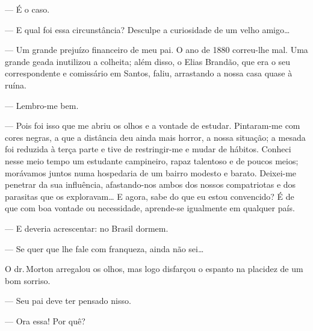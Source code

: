--- É o caso.

--- E qual foi essa circunstância? Desculpe a curiosidade de um velho amigo\ldots{}

--- Um grande prejuízo financeiro de meu pai. O ano de 1880 correu-lhe
mal. Uma grande geada inutilizou a colheita; além disso, o Elias
Brandão, que era o seu correspondente e comissário em Santos, faliu,
arrastando a nossa casa quase à ruína.

--- Lembro-me bem.

--- Pois foi isso que me abriu os olhos e a vontade de estudar.
Pintaram-me com cores negras, a que a distância deu ainda mais horror, a
nossa situação; a mesada foi reduzida à terça parte e tive de
restringir-me e mudar de hábitos. Conheci nesse meio tempo um estudante
campineiro, rapaz talentoso e de poucos meios; morávamos juntos numa
hospedaria de um bairro modesto e barato. Deixei-me penetrar da sua
influência, afastando-nos ambos dos nossos compatriotas e dos parasitas
que os exploravam\ldots{} E agora, sabe do que eu estou convencido? É de que
com boa vontade ou necessidade, aprende-se igualmente em qualquer país.


--- E deveria acrescentar: no Brasil dormem.


--- Se quer que lhe fale com franqueza, ainda não sei\ldots{}

O dr.\,Morton arregalou os olhos, mas logo disfarçou o espanto na
placidez de um bom sorriso.

--- Seu pai deve ter pensado nisso.


--- Ora essa! Por quê?


